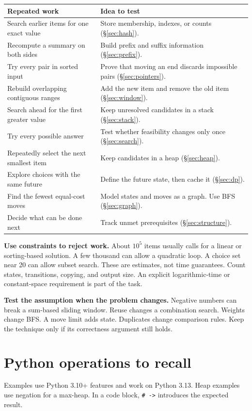 \documentclass[11pt]{article}
\newcommand{\sect}[1]{\hyperref[sec:#1]{\S\ref*{sec:#1}}}
\begin{document}
\begin{longtable}{@{}L{5.5cm}L{10.5cm}@{}}
\toprule Repeated work & Idea to test \\ \midrule\endhead
Search earlier items for one exact value & Store membership, indexes, or counts (\sect{hash}).\\
Recompute a summary on both sides & Build prefix and suffix information (\sect{prefix}).\\
Try every pair in sorted input & Prove that moving an end discards impossible pairs (\sect{pointers}).\\
Rebuild overlapping contiguous ranges & Add the new item and remove the old item (\sect{window}).\\
Search ahead for the first greater value & Keep unresolved candidates in a stack (\sect{stack}).\\
Try every possible answer & Test whether feasibility changes only once (\sect{search}).\\
Repeatedly select the next smallest item & Keep candidates in a heap (\sect{heap}).\\
Explore choices with the same future & Define the future state, then cache it (\sect{dp}).\\
Find the fewest equal-cost moves & Model states and moves as a graph. Use BFS (\sect{graph}).\\
Decide what can be done next & Track unmet prerequisites (\sect{structure}).\\
\bottomrule
\end{longtable}
\textbf{Use constraints to reject work.} About \(10^5\) items usually calls for a linear or sorting-based solution.
A few thousand can allow a quadratic loop. A choice set near 20 can allow subset search.
These are estimates, not time guarantees. Count states, transitions, copying, and output size.
An explicit logarithmic-time or constant-space requirement is part of the task.

\textbf{Test the assumption when the problem changes.}
Negative numbers can break a sum-based sliding window. Reuse changes a combination search.
Weights change BFS. A move limit adds state. Duplicates change comparison rules.
Keep the technique only if its correctness argument still holds.

\section{Python operations to recall}\label{sec:python}
Examples use Python 3.10+ features and work on Python 3.13. Heap examples use negation for a max-heap.
In a code block, \texttt{\# ->} introduces the expected result.
\end{document}
